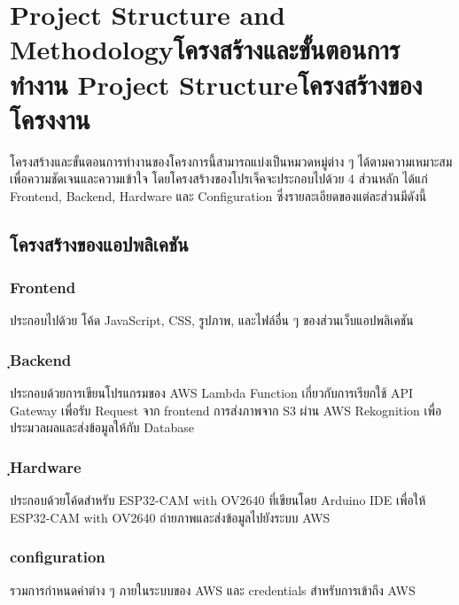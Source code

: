 \chapter{\ifproject%
\ifenglish Project Structure and Methodology\else โครงสร้างและขั้นตอนการทำงาน\fi
\else%
\ifenglish Project Structure\else โครงสร้างของโครงงาน\fi
\fi
}

\hspace{10mm} โครงสร้างและขั้นตอนการทำงานของโครงการนี้สามารถแบ่งเป็นหมวดหมู่ต่าง ๆ ได้ตามความเหมาะสมเพื่อความชัดเจนและความเข้าใจ โดยโครงสร้างของโปรเจ็คจะประกอบไปด้วย 4 ส่วนหลัก ได้แก่ Frontend, Backend, Hardware และ Configuration ซึ่งรายละเอียดของแต่ละส่วนมีดังนี้

\section{โครงสร้างของแอปพลิเคชัน}
\subsection{Frontend}
ประกอบไปด้วย โค้ด JavaScript, CSS, รูปภาพ, และไฟล์อื่น ๆ ของส่วนเว็บแอปพลิเคชัน
\subsection{ฺBackend}
ประกอบด้วยการเขียนโปรแกรมของ AWS Lambda Function เกี่ยวกับการเรียกใช้ API Gateway เพื่อรับ Request จาก frontend การส่งภาพจาก S3 ผ่าน AWS Rekognition เพื่อประมวลผลและส่งข้อมูลให้กับ Database
\subsection{ฺHardware}
ประกอบด้วยโค้ดสำหรับ ESP32-CAM with OV2640 ที่เขียนโดย Arduino IDE เพื่อให้ ESP32-CAM with OV2640 ถ่ายภาพและส่งข้อมูลไปยังระบบ AWS
\subsection{configuration}
รวมการกำหนดค่าต่าง ๆ ภายในระบบของ AWS และ credentials สำหรับการเข้าถึง AWS

\newpage
